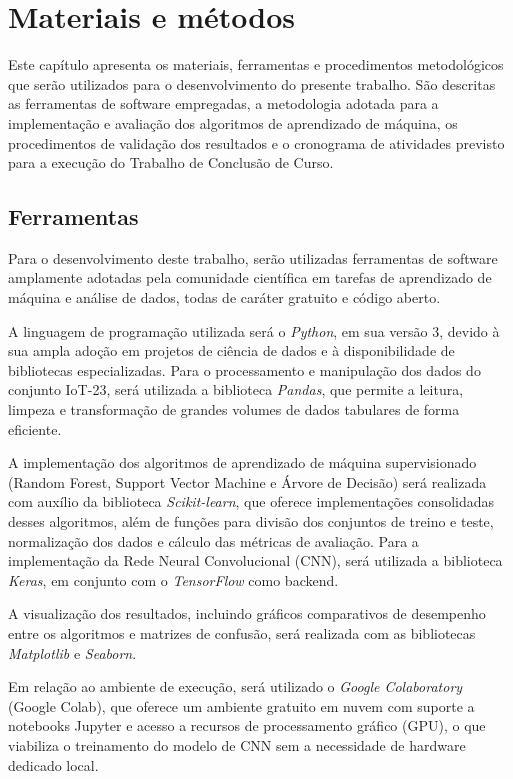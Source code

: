 \chapter{Materiais e métodos}\label{chap:materiais}

Este capítulo apresenta os materiais, ferramentas e procedimentos metodológicos que serão utilizados para o desenvolvimento do presente trabalho. São descritas as ferramentas de software empregadas, a metodologia adotada para a implementação e avaliação dos algoritmos de aprendizado de máquina, os procedimentos de validação dos resultados e o cronograma de atividades previsto para a execução do Trabalho de Conclusão de Curso.

\section{Ferramentas}

Para o desenvolvimento deste trabalho, serão utilizadas ferramentas de software amplamente adotadas pela comunidade científica em tarefas de aprendizado de máquina e análise de dados, todas de caráter gratuito e código aberto.

A linguagem de programação utilizada será o \textit{Python}, em sua versão 3, devido à sua ampla adoção em projetos de ciência de dados e à disponibilidade de bibliotecas especializadas. Para o processamento e manipulação dos dados do conjunto IoT-23, será utilizada a biblioteca \textit{Pandas}, que permite a leitura, limpeza e transformação de grandes volumes de dados tabulares de forma eficiente.

A implementação dos algoritmos de aprendizado de máquina supervisionado (Random Forest, Support Vector Machine e Árvore de Decisão) será realizada com auxílio da biblioteca \textit{Scikit-learn}, que oferece implementações consolidadas desses algoritmos, além de funções para divisão dos conjuntos de treino e teste, normalização dos dados e cálculo das métricas de avaliação. Para a implementação da Rede Neural Convolucional (CNN), será utilizada a biblioteca \textit{Keras}, em conjunto com o \textit{TensorFlow} como backend.

A visualização dos resultados, incluindo gráficos comparativos de desempenho entre os algoritmos e matrizes de confusão, será realizada com as bibliotecas \textit{Matplotlib} e \textit{Seaborn}.

Em relação ao ambiente de execução, será utilizado o \textit{Google Colaboratory} (Google Colab), que oferece um ambiente gratuito em nuvem com suporte a notebooks Jupyter e acesso a recursos de processamento gráfico (GPU), o que viabiliza o treinamento do modelo de CNN sem a necessidade de hardware dedicado local.

